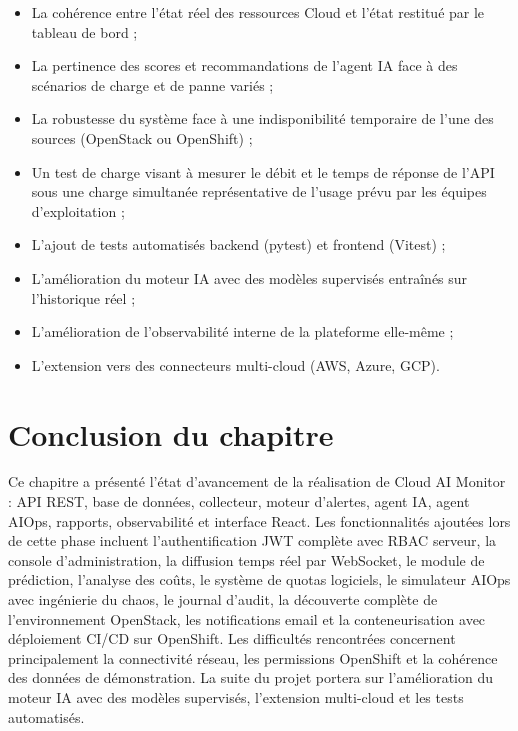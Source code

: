 \documentclass[11pt,a4paper]{report}
\begin{document}
\begin{itemize}[label=\textbullet, leftmargin=1.5cm, labelsep=0.5cm,
                itemsep=0.2em, parsep=0em, topsep=0.2em]
    \item La cohérence entre l'état réel des ressources Cloud et l'état
    restitué par le tableau de bord ;
    \item La pertinence des scores et recommandations de l'agent IA face à des
    scénarios de charge et de panne variés ;
    \item La robustesse du système face à une indisponibilité temporaire de
    l'une des sources (OpenStack ou OpenShift) ;
    \item Un test de charge visant à mesurer le débit et le temps de réponse
    de l'API sous une charge simultanée représentative de l'usage prévu par
    les équipes d'exploitation ;
    \item L'ajout de tests automatisés backend (pytest) et frontend (Vitest) ;
    \item L'amélioration du moteur IA avec des modèles supervisés entraînés
    sur l'historique réel ;
    \item L'amélioration de l'observabilité interne de la plateforme
    elle-même ;
    \item L'extension vers des connecteurs multi-cloud (AWS, Azure, GCP).
\end{itemize}

\section*{Conclusion du chapitre}

Ce chapitre a présenté l'état d'avancement de la réalisation de Cloud AI
Monitor : API REST, base de données, collecteur, moteur d'alertes, agent IA,
agent AIOps, rapports, observabilité et interface React. Les fonctionnalités
ajoutées lors de cette phase incluent l'authentification JWT complète avec
RBAC serveur, la console d'administration, la diffusion temps réel par
WebSocket, le module de prédiction, l'analyse des coûts, le système de
quotas logiciels, le simulateur AIOps avec ingénierie du chaos, le journal
d'audit, la découverte complète de l'environnement OpenStack, les
notifications email et la conteneurisation avec déploiement CI/CD sur
OpenShift. Les difficultés rencontrées concernent principalement la
connectivité réseau, les permissions OpenShift et la cohérence des données de
démonstration. La suite du projet portera sur l'amélioration du moteur IA
avec des modèles supervisés, l'extension multi-cloud et les tests automatisés.
\end{document}
